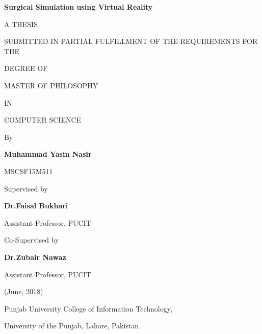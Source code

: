 \newpage
\begin{center}
\Large{\textbf{Surgical Simulation using Virtual Reality}}



A THESIS

SUBMITTED IN PARTIAL FULFILLMENT OF THE REQUIREMENTS FOR THE 

DEGREE OF

MASTER OF PHILOSOPHY

IN

COMPUTER SCIENCE

\bigskip

    By
    
\large{\textbf{Muhammad Yasin Nasir}}

\large{MSCSF15M511}

\bigskip
Supervised by

\large{\textbf{Dr.Faisal Bukhari}}

Assistant Professor, PUCIT

\bigskip
Co-Supervised by

\large{\textbf{Dr.Zubair Nawaz}}

Assistant Professor, PUCIT

\bigskip
(June, 2018)

\bigskip
Punjab University College of Information Technology,

\bigskip
University of the Punjab, Lahore, Pakistan. 

\end{center}
\bigskip




 








%





